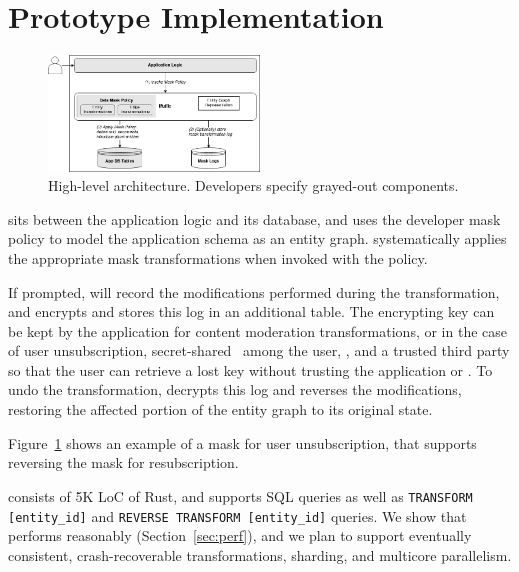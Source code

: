 \section{Prototype Implementation}
\label{sec:proto}

\begin{figure}[t!]
    \centering
    \includegraphics[width=0.5\textwidth]{img/muffle}

    \caption{High-level \sys architecture. Developers specify grayed-out components.}
    \label{fig:arch}
\end{figure}

\sys sits between the application logic and its database, and uses the developer mask policy to
model the application schema as an entity graph. \sys systematically applies the appropriate
mask transformations when invoked with the policy. 

If prompted, \sys will record the modifications performed during the transformation, and encrypts and
stores this log in an additional table. The encrypting key can be kept by the application for \eg content
moderation transformations, or in the case of user unsubscription, secret-shared~\cite{secretsharing}
among the user, \sys, and a trusted third party so that the user can retrieve a lost key without
trusting the application or \sys. To undo the transformation, \sys decrypts this log and reverses the
modifications, restoring the affected portion of the entity graph to its original state.

Figure~\ref{fig:arch} shows an example of a mask for user unsubscription, that supports reversing
the mask for resubscription.

\sys consists of 5K LoC of Rust, and supports SQL queries as well as \texttt{TRANSFORM
[entity\_id]} and \texttt{REVERSE TRANSFORM [entity\_id]} queries.
We show that \sys performs reasonably (Section~\ref{sec:perf}), and we plan to support eventually
consistent, crash-recoverable transformations, sharding, and multicore parallelism.

